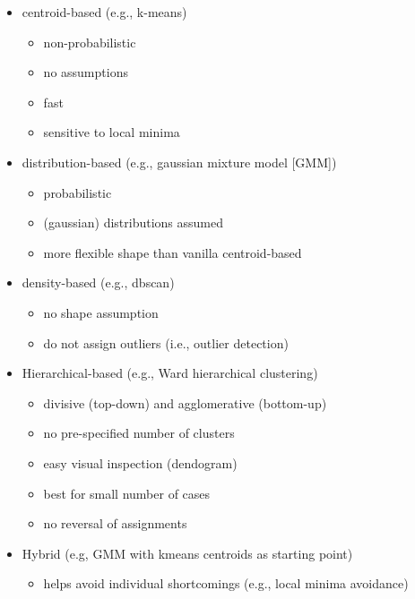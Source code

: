 \begin{itemize}
  \item centroid-based (e.g., k-means)
  \begin{itemize}
    \item non-probabilistic
    \item no assumptions
    \item fast
    \item sensitive to local minima
  \end{itemize}
  \item distribution-based (e.g., gaussian mixture model [GMM])
  \begin{itemize}
    \item probabilistic
    \item (gaussian) distributions assumed
    \item more flexible shape than vanilla centroid-based
  \end{itemize}
  \item density-based (e.g., dbscan)
  \begin{itemize}
    \item no shape assumption
    \item do not assign outliers (i.e., outlier detection)
  \end{itemize}
  \item Hierarchical-based (e.g., Ward hierarchical clustering)
  \begin{itemize}
    \item divisive (top-down) and agglomerative (bottom-up)
    \item no pre-specified number of clusters
    \item easy visual inspection (dendogram)
    \item best for small number of cases
    \item no reversal of assignments
  \end{itemize}
  \item Hybrid (e.g, GMM with kmeans centroids as starting point)
  \begin{itemize}
    \item helps avoid individual shortcomings (e.g., local minima avoidance)
  \end{itemize}
\end{itemize}
